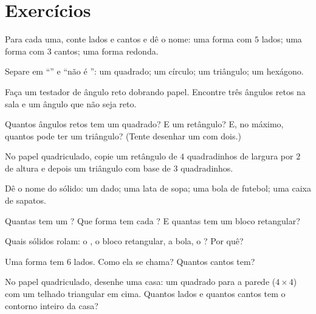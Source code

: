 \section{Exercícios}

\begin{exercise}[$\star$]\label{exo:g2:shapes:1}
Para cada uma, conte lados e cantos e dê o nome: uma forma com $5$
lados; uma forma com $3$ cantos; uma forma redonda.
\end{exercise}

\begin{exercise}[$\star$]\label{exo:g2:shapes:2}
Separe em ``'' e ``não é '': um quadrado; um
círculo; um triângulo; um hexágono.
\end{exercise}

\begin{exercise}[$\star$]\label{exo:g2:shapes:3}
Faça um testador de ângulo reto dobrando papel. Encontre três
ângulos retos na sala e um ângulo que não seja reto.
\end{exercise}

\begin{exercise}[$\star$]\label{exo:g2:shapes:4}
Quantos ângulos retos tem um quadrado? E um retângulo? E, no máximo,
quantos pode ter um triângulo? (Tente desenhar um com dois.)
\end{exercise}

\begin{exercise}[$\star$]\label{exo:g2:shapes:5}
No papel quadriculado, copie um retângulo de $4$ quadradinhos de
largura por $2$ de altura e depois um triângulo com base de $3$
quadradinhos.
\end{exercise}

\begin{exercise}[$\star$]\label{exo:g2:shapes:6}
Dê o nome do sólido: um dado; uma lata de sopa; uma bola de futebol;
uma caixa de sapatos.
\end{exercise}

\begin{exercise}[$\star$]\label{exo:g2:shapes:7}
Quantas  tem um ? Que forma tem cada ? E quantas 
tem um bloco retangular?
\end{exercise}

\begin{exercise}[$\star$]\label{exo:g2:shapes:8}
Quais sólidos rolam: o , o bloco retangular, a bola, o ?
Por quê?
\end{exercise}

\begin{exercise}[$\star$]\label{exo:g2:shapes:9}
Uma forma tem $6$ lados. Como ela se chama? Quantos cantos tem?
\end{exercise}

\begin{exercise}[$\star\star$]\label{exo:g2:shapes:10}
No papel quadriculado, desenhe uma casa: um quadrado para a parede
($4 \times 4$) com um telhado triangular em cima. Quantos lados e
quantos cantos tem o contorno inteiro da casa?
\end{exercise}
